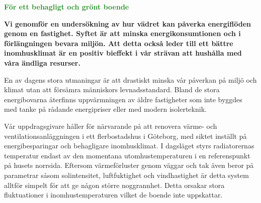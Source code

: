 \documentclass[11pt,a4paper]{article}
\begin{document}
\pagestyle{fancy}
\rhead{\sc\footnotesize \today}
\mbox{}
\vspace{4mm}

\begin{center}
\textcolor{ForestGreen}{\textbf{\Huge För ett behagligt och grönt boende}}
\end{center}

\mbox{}
\vspace{4mm}

\setlength{\columnsep}{5mm}
\begin{multicols}{2}
\addtolength{\parskip}{1mm}
\linespread{1.1}
\normalsize

\textbf{Vi genomför en undersökning av hur vädret kan påverka energiflöden genom en fastighet. Syftet är att minska energikonsumtionen och i förlängningen bevara miljön. Att detta också leder till ett bättre inomhusklimat är en positiv bieffekt i vår strävan att hushålla med våra ändliga resurser.}

\begin{comment}
\textbf{I dagens samhälle blir kontrollen över vår energikonsumtion allt viktigare, en naturlig följd av både miljömedvetenhet och skenande elpriser. En stor del av våra bostäders energianvändning går åt till uppvärmning, vilket föranleder frågeställningen: kan man minska denna förbrukning genom att ta hänsyn till hela spektrumet av väderparametrar?}
\end{comment}

En av dagens stora utmaningar är att drastiskt minska vår påverkan på miljö och klimat utan att försämra människors levnadsstandard. Bland de stora energibovarna återfinns uppvärmningen av äldre fastigheter som inte byggdes med tanke på rådande energipriser eller med modern isolerteknik.

Vår uppdragsgivare håller för närvarande på att renovera värme- och ventilationsanläggningen i ett flerbostadshus i Göteborg, med siktet inställt på energibesparingar och behagligare inomhusklimat. I dagsläget styrs radiatorernas  temperatur endast av den momentana utomhustemperaturen i en referenspunkt på husets norrsida. Eftersom värmeförluster genom väggar och tak även beror på parametrar såsom solintensitet, luftfuktighet och vindhastighet är detta system alltför simpelt för att ge någon större noggrannhet. Detta orsakar stora fluktuationer i inomhustemperaturen vilket de boende inte uppskattar.


\end{multicols}
\end{document}
